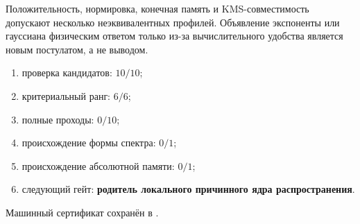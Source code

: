 \begin{nogocriterion}
Положительность, нормировка, конечная память и KMS-совместимость допускают
несколько неэквивалентных профилей. Объявление экспоненты или гауссиана
физическим ответом только из-за вычислительного удобства является новым
постулатом, а не выводом.
\end{nogocriterion}

\begin{protocol}\begin{enumerate}
\item проверка кандидатов: \textbf{$10/10$};
\item критериальный ранг: \textbf{$6/6$};
\item полные проходы: \textbf{$0/10$};
\item происхождение формы спектра: \textbf{$0/1$};
\item происхождение абсолютной памяти: \textbf{$0/1$};
\item следующий гейт: \textbf{родитель локального причинного ядра распространения}.
\end{enumerate}\end{protocol}

Машинный сертификат сохранён в
.